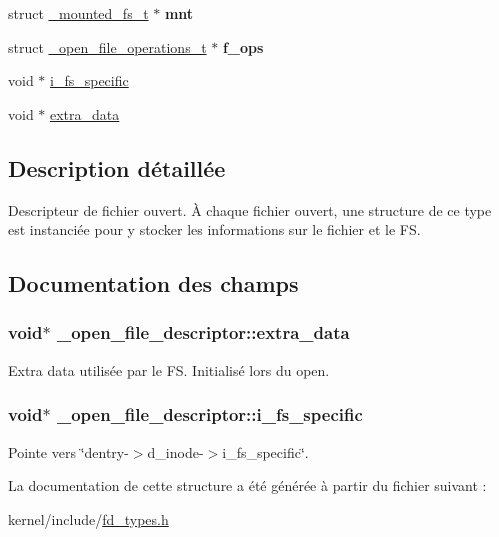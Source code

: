 \begin{DoxyCompactItemize}
\item 
\hypertarget{struct__open__file__descriptor_a65408e330b7a3763de5549c826564730}{struct \hyperlink{struct__mounted__fs__t}{\-\_\-mounted\-\_\-fs\-\_\-t} $\ast$ {\bfseries mnt}}\label{struct__open__file__descriptor_a65408e330b7a3763de5549c826564730}

\item 
\hypertarget{struct__open__file__descriptor_a6cd707cf9a5d837feba5ef2a2f91bfcd}{struct \hyperlink{struct__open__file__operations__t}{\-\_\-open\-\_\-file\-\_\-operations\-\_\-t} $\ast$ {\bfseries f\-\_\-ops}}\label{struct__open__file__descriptor_a6cd707cf9a5d837feba5ef2a2f91bfcd}

\item 
void $\ast$ \hyperlink{struct__open__file__descriptor_a2fc86f185e4b611a90f7727ef26ff3de}{i\-\_\-fs\-\_\-specific}
\item 
void $\ast$ \hyperlink{struct__open__file__descriptor_a99824795a31a8adea2162aed74162017}{extra\-\_\-data}
\end{DoxyCompactItemize}


\subsection{Description détaillée}
Descripteur de fichier ouvert. À chaque fichier ouvert, une structure de ce type est instanciée pour y stocker les informations sur le fichier et le F\-S. 

\subsection{Documentation des champs}
\hypertarget{struct__open__file__descriptor_a99824795a31a8adea2162aed74162017}{
\subsubsection[{extra\-\_\-data}]{\setlength{\rightskip}{0pt plus 5cm}void$\ast$ \-\_\-open\-\_\-file\-\_\-descriptor\-::extra\-\_\-data}}\label{struct__open__file__descriptor_a99824795a31a8adea2162aed74162017}
Extra data utilisée par le F\-S. Initialisé lors du open. \hypertarget{struct__open__file__descriptor_a2fc86f185e4b611a90f7727ef26ff3de}{
\subsubsection[{i\-\_\-fs\-\_\-specific}]{\setlength{\rightskip}{0pt plus 5cm}void$\ast$ \-\_\-open\-\_\-file\-\_\-descriptor\-::i\-\_\-fs\-\_\-specific}}\label{struct__open__file__descriptor_a2fc86f185e4b611a90f7727ef26ff3de}
Pointe vers \char`\"{}dentry-\/$>$d\-\_\-inode-\/$>$i\-\_\-fs\-\_\-specific\char`\"{}. 

La documentation de cette structure a été générée à partir du fichier suivant \-:\begin{DoxyCompactItemize}
\item 
kernel/include/\hyperlink{fd__types_8h}{fd\-\_\-types.\-h}\end{DoxyCompactItemize}
